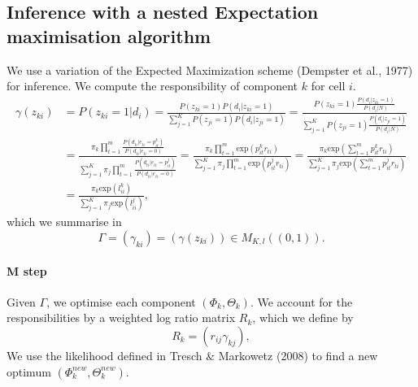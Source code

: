 \documentclass[12pt]{article}
\begin{document}
\subsection{Inference with a nested Expectation maximisation algorithm}
We use a variation of the Expected Maximization scheme (Dempster et al., 1977) for inference. We compute the responsibility of component $k$ for cell $i$.
\begin{align}\label{eq:gammaki}
\gamma(z_{ki}) &= P(z_{ki} = 1|d_i) = \frac{P(z_{ki} = 1)P(d_i|z_{ki} = 1)}{\sum\limits_{j=1}^KP(z_{ji} = 1)P(d_i|z_{ji} = 1)} = \frac{P(z_{ki} = 1)\frac{P(d_i|z_{ki} = 1)}{P(d_i|N)}}{\sum\limits_{j=1}^KP(z_{ji} = 1)\frac{P(d_i|z_{ji} = 1)}{P(d_i|N)}}\nonumber\\
&=   \frac{\pi_k\prod\limits_{t=1}^m\frac{P(d_{ti}|e_{ti} = p_{it}^k)}{P(d_{ti}|e_{ti} = 0)}}{\sum\limits_{j=1}^K\pi_j\prod\limits_{t=1}^m\frac{P(d_{ti}|e_{ti} = p_{it}^j)}{P(d_{ti}|e_{ti} = 0)}} =   \frac{\pi_k\prod\limits_{t=1}^m \mathrm{exp}(p_{it}^kr_{ti})}{\sum\limits_{j=1}^K\pi_j\prod\limits_{t=1}^m\mathrm{exp}(p_{it}^j r_{ti})} = \frac{\pi_k\mathrm{exp}\left(\sum\limits_{t=1}^m p_{it}^k r_{ti}\right)}{\sum\limits_{j=1}^K\pi_j\mathrm{exp}\left(\sum\limits_{t=1}^mp_{it}^j r_{ti}\right)}\nonumber\\
&= \frac{\pi_k \mathrm{exp}\left(l_{ii}^k\right)}{\sum\limits_{j=1}^K\pi_j \mathrm{exp}\left(l_{ii}^j\right)},
\end{align}
which we summarise in
\begin{equation*}
\Gamma = (\gamma_{ki}) = (\gamma(z_{ki})) \in M_{K,l} (\left(0,1\right)).
\end{equation*}
 
\paragraph{M step}
Given $\Gamma$, we optimise each component $(\Phi_k, \Theta_k)$. We account for the responsibilities by a weighted log ratio matrix $R_k$, which we define by
\begin{equation*}
R_k = ( r_{ij} \gamma_{kj} ),%
\end{equation*}
 We use the likelihood defined in Tresch \& Markowetz (2008) to find a new optimum $\left(\Phi_k^{new}, \Theta_k^{new}\right)$.
\end{document}
